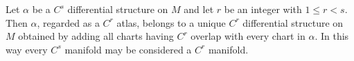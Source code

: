 Let $\alpha$ be a $C^s$ differential structure on $M$ and let $r$ be an integer with $1 \leqslant r < s$. Then $\alpha$, regarded as a $C^r$ atlas, belongs to a unique $C^r$ differential structure on $M$ obtained by adding all charts having $C^r$ overlap with every chart in $\alpha$. In this way every $C^s$ manifold may be considered a $C^r$ manifold.
